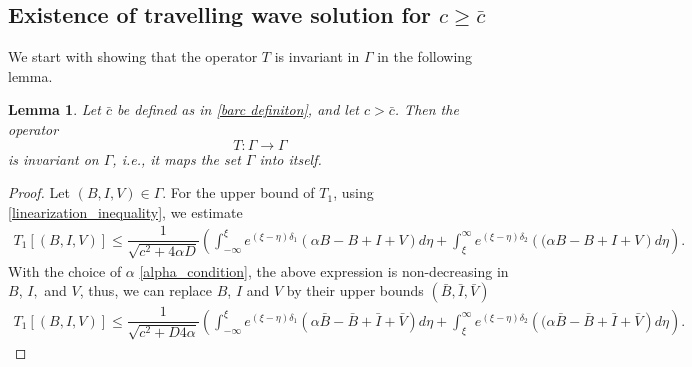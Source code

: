 \documentclass[11pt]{article}
\newtheorem{lemma}[thm]{Lemma}
\theoremstyle{definition}
\begin{document}
{\subsection{Existence of travelling wave solution for 
\texorpdfstring{$c \ge \bar{c}$}{c >= c-bar}}
\label{sec:existance} We start with showing that the operator $T$ is invariant in $\Gamma$ in the following lemma. 
\begin{lemma}
Let $\bar{c}$ be defined as in \eqref{barc definiton}, and let $c > \bar{c}$. Then the operator 
\[
T : \Gamma \longrightarrow \Gamma
\] 
is invariant on $\Gamma$, i.e., it maps the set $\Gamma$ into itself.
\end{lemma}
\begin{proof}
    Let $(B, I , V) \in \Gamma$. For the upper bound of $T_1$, using \eqref{linearization_inequality}, we estimate 
    \begin{align}
        T_1[(B,I,V)] \le \dfrac{1}{\sqrt{c^2+4 \alpha D}} \left( \int_{-\infty}^{\xi} e^{(\xi- \eta)\delta_1} {\left(\alpha B-B+I+V \right)}d \eta +  \int_{\xi}^{\infty} e^{(\xi- \eta)\delta_2} {\left((\alpha B-B+I+V\right)}d \eta \right).
    \end{align}
    With the choice of $\alpha$ \eqref{alpha_condition}, the above expression is non-decreasing in $B$, $I,$ and $V$, thus, we can replace $B$, $I$ and $V$ by their upper bounds $(\bar{B},\bar{I},\bar{V})$
       \begin{align}
        T_1[(B,I,V)] \le \dfrac{1}{\sqrt{c^2+D4 \alpha}} \left( \int_{-\infty}^{\xi} e^{(\xi- \eta)\delta_1} {\left(\alpha \bar B-\bar B+\bar I+\bar V \right)}d \eta +  \int_{\xi}^{\infty} e^{(\xi- \eta)\delta_2} {\left((\alpha \bar  B-\bar B+\bar I+\bar V\right)}d \eta \right).
    \end{align}


\end{proof}}
\end{document}
